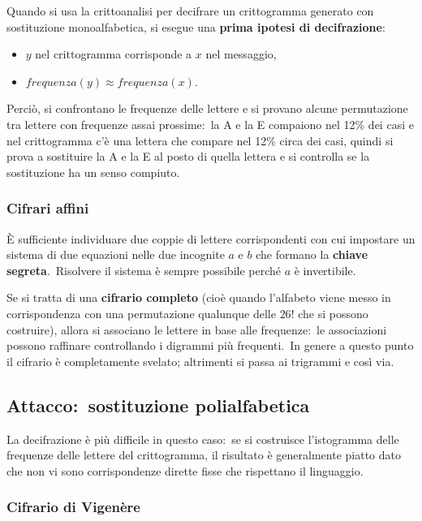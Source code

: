 Quando si usa la crittoanalisi per decifrare un crittogramma generato con sostituzione monoalfabetica, si esegue una \textbf{prima ipotesi di decifrazione}:
\begin{itemize}
    \item $y$ nel crittogramma corrisponde a $x$ nel messaggio,
    \item $\mathit{frequenza}(y) \approx \mathit{frequenza}(x)$.
\end{itemize}
Perciò, si confrontano le frequenze delle lettere e si provano alcune permutazione tra lettere con frequenze assai prossime:\ la A e la E compaiono nel 12\% dei casi e nel crittogramma c'è una lettera che compare nel 12\% circa dei casi, quindi si prova a sostituire la A e la E al posto di quella lettera e si controlla se la sostituzione ha un senso compiuto.

\subsubsection{Cifrari affini}

È sufficiente individuare due coppie di lettere corrispondenti con cui impostare un sistema di due equazioni nelle due incognite $a$ e $b$ che formano la \textbf{chiave segreta}.\
Risolvere il sistema è sempre possibile perché $a$ è invertibile.\

Se si tratta di una \textbf{cifrario completo} (cioè quando l'alfabeto viene messo in corrispondenza con una permutazione qualunque delle $26!$ che si possono costruire), allora si associano le lettere in base alle frequenze:\ le associazioni possono raffinare controllando i digrammi più frequenti.\
In genere a questo punto il cifrario è completamente svelato; altrimenti si passa ai trigrammi e così via.\

\subsection{Attacco:\ sostituzione polialfabetica}

La decifrazione è più difficile in questo caso:\ se si costruisce l'istogramma delle frequenze delle lettere del crittogramma, il risultato è generalmente piatto dato che non vi sono corrispondenze dirette fisse che rispettano il linguaggio.\

\subsubsection{Cifrario di Vigenère}

